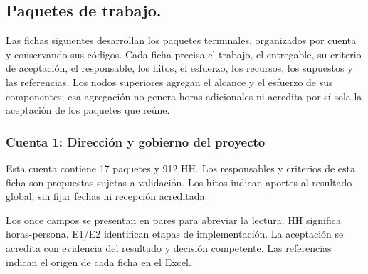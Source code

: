 \subsection{Paquetes de trabajo.}
Las fichas siguientes desarrollan los paquetes terminales, organizados por cuenta y conservando sus códigos. Cada ficha precisa el trabajo, el entregable, su criterio de aceptación, el responsable, los hitos, el esfuerzo, los recursos, los supuestos y las referencias. Los nodos superiores agregan el alcance y el esfuerzo de sus componentes; esa agregación no genera horas adicionales ni acredita por sí sola la aceptación de los paquetes que reúne.


\subsubsection{Cuenta 1: Dirección y gobierno del proyecto}
\label{subsec:dic-edt-cuenta-1}

Esta cuenta contiene 17 paquetes y 912 HH. Los responsables y criterios de esta ficha son propuestas sujetas a validación. Los hitos indican aportes al resultado global, sin fijar fechas ni recepción acreditada.

Los once campos se presentan en pares para abreviar la lectura. HH significa horas-persona. E1/E2 identifican etapas de implementación. La aceptación se acredita con evidencia del resultado y decisión competente. Las referencias indican el origen de cada ficha en el Excel.

